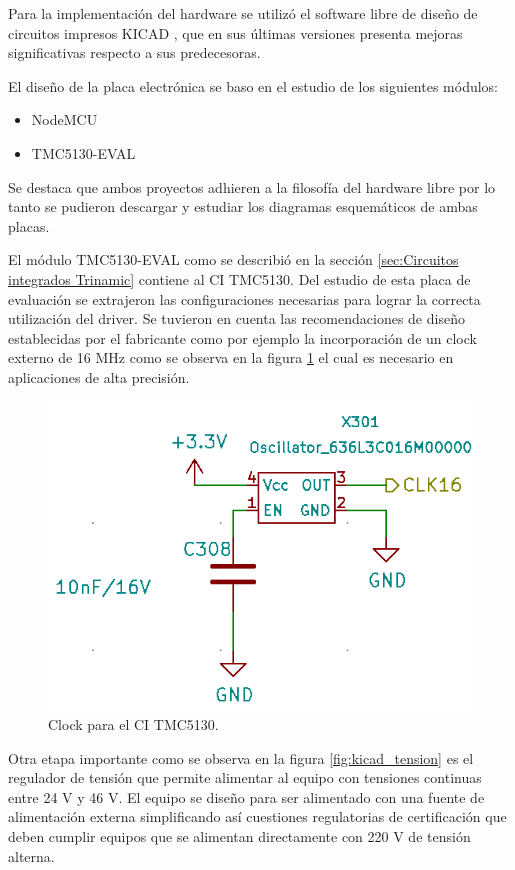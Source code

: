 Para la implementación del hardware se utilizó el software libre de diseño de circuitos impresos KICAD \citep{web_kicad}, que en sus últimas versiones presenta mejoras significativas respecto a sus predecesoras.

El diseño de la placa electrónica se baso en el estudio de los siguientes módulos:
\begin{itemize}
\item NodeMCU \citep{web_nodemcu}
\item TMC5130-EVAL \citep{3_web_trinamic_placa}	
\end{itemize}
Se destaca que ambos proyectos adhieren a la filosofía del hardware libre por lo tanto se pudieron descargar y estudiar los diagramas esquemáticos de ambas placas. 

El módulo TMC5130-EVAL como se describió en la sección \ref{sec:Circuitos integrados Trinamic} contiene al CI TMC5130. Del estudio de esta placa de evaluación se extrajeron las configuraciones necesarias para lograr la correcta utilización del driver. Se tuvieron en cuenta las recomendaciones de diseño establecidas por el fabricante como por ejemplo la incorporación de un clock externo de 16 MHz como se observa en la figura \ref{fig:kicad_clock} el cual es necesario en aplicaciones de alta precisión. 

\begin{figure}[h]
	\centering
	\includegraphics[width=.5\textwidth]{./Figures/kicad_clock.png}
	\caption{Clock para el CI TMC5130.}
	\label{fig:kicad_clock}
\end{figure}

Otra etapa importante como se observa en la figura \ref{fig:kicad_tension} es el regulador de tensión que permite alimentar al equipo con tensiones continuas entre 24 V y 46 V.
El equipo se diseño para ser alimentado con una fuente de alimentación externa simplificando así cuestiones regulatorias de certificación que deben cumplir equipos que se alimentan directamente con 220 V de tensión alterna.


